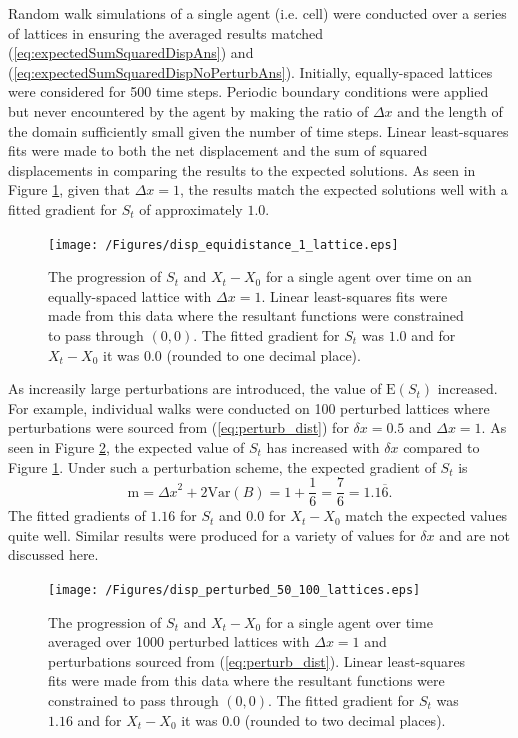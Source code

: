 \documentclass[11pt,a4paper]{article}
\begin{document}
			Random walk simulations of a single agent (i.e. cell) were conducted over a series of lattices in ensuring the averaged results matched (\ref{eq:expectedSumSquaredDispAns}) and (\ref{eq:expectedSumSquaredDispNoPerturbAns}). Initially, equally-spaced lattices were considered for 500 time steps. Periodic boundary conditions were applied but never encountered by the agent by making the ratio of $\Delta x$ and the length of the domain sufficiently small given the number of time steps. Linear least-squares fits were made to both the net displacement and the sum of squared displacements in comparing the results to the expected solutions. As seen in Figure \ref{fig:disp_equidistance_1_lattice}, given that $\Delta x = 1$, the results match the expected solutions well with a fitted gradient for $S_t$ of approximately $1.0$. 

			\begin{figure}[tbh]
				\centering
					\texttt{[image: /Figures/disp\_equidistance\_1\_lattice.eps]}
				\caption{The progression of $S_t$ and $X_t - X_0$ for a single agent over time on an equally-spaced lattice with $\Delta x = 1$. Linear least-squares fits were made from this data where the resultant functions were constrained to pass through $(0,0)$. The fitted gradient for $S_t$ was $1.0$ and for $X_t - X_0$ it was $0.0$ (rounded to one decimal place).}
				\label{fig:disp_equidistance_1_lattice}
			\end{figure}

			As increasily large perturbations are introduced, the value of $\mathrm{E} \left(S_t \right)$ increased. For example, individual walks were conducted on 100 perturbed lattices where perturbations were sourced from (\ref{eq:perturb_dist}) for $\delta x = 0.5$ and $\Delta x = 1$. As seen in Figure \ref{fig:disp_perturbed_50_100_lattices}, the expected value of $S_t$ has increased with $\delta x$ compared to Figure \ref{fig:disp_equidistance_1_lattice}. Under such a perturbation scheme, the expected gradient of $S_t$ is  
			\begin{equation*}
				\text{m} = {\Delta x}^2 + 2 \mathrm{Var} \left(B \right) =  1 + \frac{1}{6} = \frac{7}{6} = 1.1\overline{6}.
			\end{equation*}
			The fitted gradients of $1.16$ for $S_t$ and $0.0$ for $X_t - X_0$ match the expected values quite well. Similar results were produced for a variety of values for $\delta x$ and are not discussed here.

			\begin{figure}[tbh]
				\centering
					\texttt{[image: /Figures/disp\_perturbed\_50\_100\_lattices.eps]}
				\caption{The progression of $S_t$ and $X_t - X_0$ for a single agent over time averaged over 1000 perturbed lattices with $\Delta x = 1$ and perturbations sourced from (\ref{eq:perturb_dist}). Linear least-squares fits were made from this data where the resultant functions were constrained to pass through $(0,0)$. The fitted gradient for $S_t$ was $1.16$ and for $X_t - X_0$ it was $0.0$ (rounded to two decimal places).}
				\label{fig:disp_perturbed_50_100_lattices}
			\end{figure}
\end{document}

